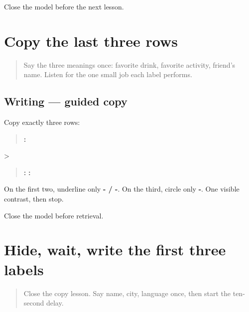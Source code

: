 \begin{tcolorbox}[breakable,colback=teal!4,colframe=teal!35!black,title={Before you move on}]
Close the model before the next lesson.
\end{tcolorbox}
\section[āvaḍte pey · āvaḍtī kṛtī · mitrāce nāv]{Copy the last three rows}

\label{lesson:MR-A1F02-last-three-copy}



\begin{quote}
Say the three meanings once: favorite drink, favorite activity, friend's name. Listen for the one small job each label performs.
\end{quote}

\subsection*{Writing — guided copy}
Copy exactly three rows:

\begin{quote}
\textbf{ : }
\end{quote}

>

\begin{quote}
\textbf{ : } \textbf{ : }
\end{quote}

On the first two, underline only \textbf{- / -}. On the third, circle only \textbf{-}. One visible contrast, then stop.

\begin{tcolorbox}[breakable,colback=teal!4,colframe=teal!35!black,title={Before you move on}]
Close the model before retrieval.
\end{tcolorbox}
\section[nāv · śahar · bhāṣā]{Hide, wait, write the first three labels}

\label{lesson:MR-A1F03-first-three-delayed}



\begin{quote}
Close the copy lesson. Say name, city, language once, then start the ten-second delay.
\end{quote}

